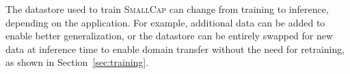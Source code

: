 \documentclass[10pt,twocolumn,letterpaper]{article}
\newcommand{\model}{\textsc{SmallCap}\xspace}
\begin{document}


The datastore used to train \model can change from training to inference, depending on the application. For example, additional data can be added to enable better generalization, or the datastore can be entirely swapped for new data at inference time to enable domain transfer without the need for retraining, as shown in Section~\ref{sec:training}.



\end{document}
